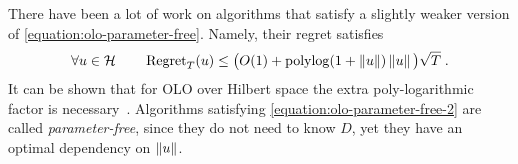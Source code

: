 There have been a lot of work on algorithms \citep{Streeter-McMahan-2012,
Orabona-2013, McMahan-Abernethy-2013,
McMahan-Orabona-2014,Orabona-2014} that satisfy a slightly
weaker version of \eqref{equation:olo-parameter-free}. Namely, their regret satisfies
\begin{equation}
\label{equation:olo-parameter-free-2}
\forall u \in \mathcal{H} \qquad \operatorname{Regret}_T(u) \le \big(O(1)+\operatorname{polylog}(1 + \left\|{u}\right\|)\left\|{u}\right\| \big) \sqrt{T} \; .
\end{equation}
It can be shown that for \ac{OLO} over Hilbert space the extra poly-logarithmic
factor is necessary~\citep{McMahan-Abernethy-2013,Orabona-2013}. Algorithms
satisfying \eqref{equation:olo-parameter-free-2} are called
\emph{parameter-free}, since they do not need to know $D$, yet they have an
optimal dependency on $\left\|{u}\right\|$.
